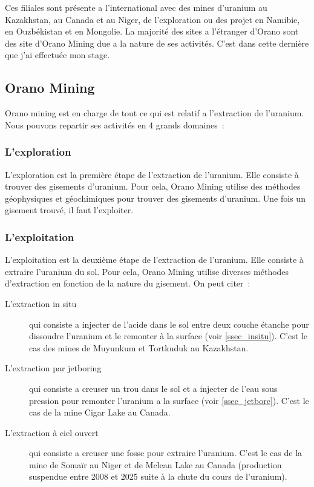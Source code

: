 Ces filiales sont présente a l'international avec des mines d'uranium au Kazakhstan, au Canada et au Niger, de l'exploration ou des projet en Namibie, en Ouzbékistan et en Mongolie. La majorité des sites a l'étranger d'Orano sont des site d'Orano Mining due a la nature de ses activités. C'est dans cette dernière que j'ai effectuée mon stage.
\subsection{Orano Mining}

Orano mining est en charge de tout ce qui est relatif a l'extraction de l'uranium. Nous pouvons repartir ses activités en 4 grands domaines~:
\subsubsection{L'exploration}
L'exploration est la première étape de l'extraction de l'uranium. Elle consiste à trouver des gisements d'uranium. Pour cela, Orano Mining utilise des méthodes géophysiques et géochimiques pour trouver des gisements d'uranium. Une fois un gisement trouvé, il faut l'exploiter.

\subsubsection{L'exploitation}
L'exploitation est la deuxième étape de l'extraction de l'uranium. Elle consiste à extraire l'uranium du sol. Pour cela, Orano Mining utilise diverses méthodes d'extraction en fonction de la nature du gisement. On peut citer~:
\begin{description}
\item [L'extraction in situ] qui consiste a injecter de l'acide dans le sol entre deux couche étanche pour dissoudre l'uranium et le remonter à la surface (voir \cref{ssec_insitu}). C'est le cas des mines de Muyunkum et Tortkuduk au Kazakhstan.
\item [L'extraction par jetboring] qui consiste a creuser un trou dans le sol et a injecter de l'eau sous pression pour remonter l'uranium a la surface (voir \cref{ssec_jetbore}). C'est le cas de la mine Cigar Lake au Canada.
\item [L'extraction à ciel ouvert] qui consiste a creuser une fosse pour extraire l'uranium. C'est le cas de la mine de Somaïr au Niger et de Mclean Lake au Canada (production suspendue entre 2008 et 2025 suite à la chute du cours de l'uranium).
\end{description}

